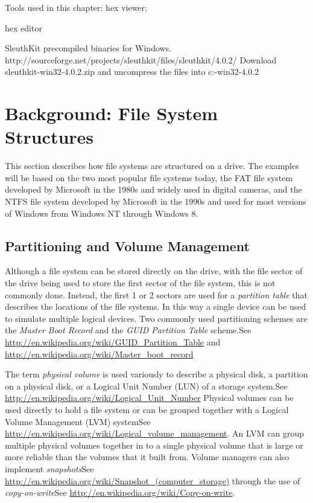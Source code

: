 \documentclass[11pt,letter]{book}
\newcommand{\wikipedia}[1]{See \url{#1}}
\newcommand{\wikipediab}[1]{ and \url{#1}}
\begin{document}
Tools used in this chapter: hex viewer;

hex editor

SleuthKit precompiled binaries for
Windows. http://sourceforge.net/projects/sleuthkit/files/sleuthkit/4.0.2/
  Download sleuthkit-win32-4.0.2.zip and uncompress the files into
  c:\sleuthkit-win32-4.0.2



\section{Background: File System Structures}
This section describes how file systems are structured on a drive. The
examples will be based on the two most popular file systems today, the
FAT file system developed by Microsoft in the 1980s and widely used in
digital cameras, and the NTFS file system developed by Microsoft in
the 1990s and used for most versions of Windows from Windows NT
through Windows 8.


\subsection{Partitioning and Volume Management}

Although a file system can be stored directly on the drive, with the
file sector of the drive being used to store the first sector of the
file system, this is not commonly done. Instead, the first 1 or 2
sectors are used for a \emph{partition table} that describes the
locations of the file systems. In this way a single device can be used
to simulate multiple logical devices. Two commonly used partitioning
schemes are the \emph{Master Boot Record} and the \emph{GUID Partition
  Table} scheme.\wikipedia{http://en.wikipedia.org/wiki/GUID_Partition_Table}
       \wikipediab{http://en.wikipedia.org/wiki/Master_boot_record}

The term \emph{physical volume} is used variously to describe a
physical disk, a partition on a physical disk, or a Logical Unit
Number (LUN) of a storage
system.\wikipedia{http://en.wikipedia.org/wiki/Logical_Unit_Number}
Physical volumes can be used directly to hold a file system or can be
grouped together with a Logical Volume Management (LVM)
system\wikipedia{http://en.wikipedia.org/wiki/Logical_volume_management}. An
LVM can group multiple physical volumes together in to a single
physical volume that is large or more reliable than the volumes that
it built from. Volume managers can also implement
\emph{snapshots}\wikipedia{http://en.wikipedia.org/wiki/Snapshot_(computer_storage)}
through the use of
\emph{copy-on-write}\wikipedia{http://en.wikipedia.org/wiki/Copy-on-write}.
\end{document}
